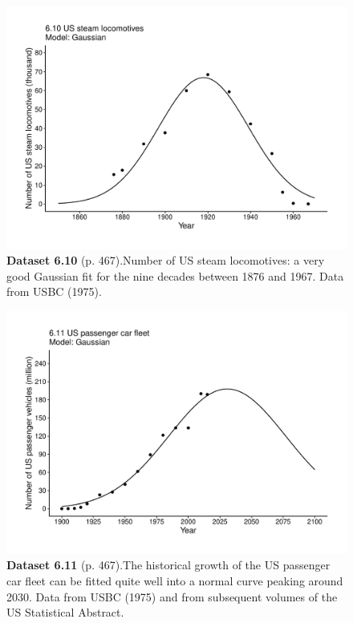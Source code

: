 \documentclass[aps,rmp,preprint,superscriptaddress,10pt,onecolumn]{article}
\begin{document}
\clearpage
\begin{figure}[h]
\includegraphics[width=\textwidth]{output/figs-ggplot/6.10.pdf}
\caption*{\textbf{Dataset 6.10} (p. 467).Number of US steam locomotives: a very good Gaussian fit for the nine decades between 1876 and 1967. Data from USBC (1975). }
\end{figure}
	
\clearpage
\begin{figure}[h]
\includegraphics[width=\textwidth]{output/figs-ggplot/6.11.pdf}
\caption*{\textbf{Dataset 6.11} (p. 467).The historical growth of the US passenger car fleet can be fitted quite well into a normal curve peaking around 2030. Data from USBC (1975) and from subsequent volumes of the US Statistical Abstract. }
\end{figure}
	
\end{document}
